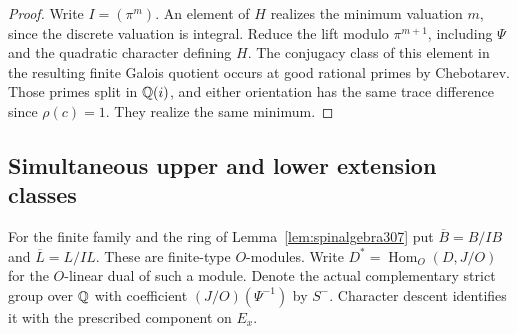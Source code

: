 \documentclass[a4paper,11pt]{article}
\theoremstyle{definition}
\theoremstyle{remark}
\numberwithin{equation}{section}
\begin{document}
\begin{proof}
Write \(I=(\pi^m)\). An element of \(H\) realizes the minimum
valuation \(m\), since the discrete valuation is integral.
Reduce the lift modulo \(\pi^{m+1}\), including \(\Psi\)
and the quadratic character defining \(H\). The conjugacy
class of this element in the resulting finite Galois quotient
occurs at good rational primes by Chebotarev. Those primes
split in \(\mathbb Q(i)\), and either orientation has the same trace
difference since \(\rho(c)=1\). They realize the same minimum.
\end{proof}

\subsection{Simultaneous upper and lower extension classes}\label{nav:III-69}
For the finite family and the ring of
Lemma~\ref{lem:spinalgebra307} put \(\overline B=B/IB\)
and \(\overline L=L/IL\). These are finite-type \(O\)-modules.
Write \(D^*=\operatorname{Hom}_O(D,J/O)\) for the
\(O\)-linear dual of such a module. Denote the actual
complementary strict group over \(\mathbb Q\) with coefficient
\((J/O)(\Psi^{-1})\) by \(S^-\). Character descent
identifies it with the prescribed component on \(E_x\).
\end{document}
